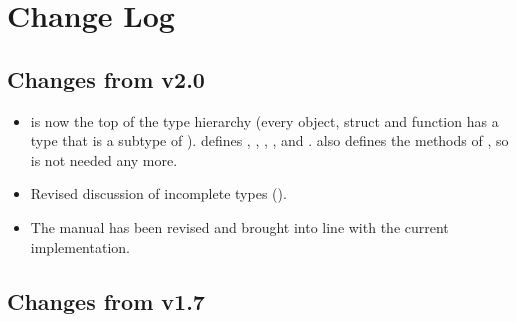 \documentclass[12pt,twoside,notitlepage]{report}
\begin{document}


 

\clearpage

{\parskip 0pt
\addtolength{\cftsecnumwidth}{0.5em}
\addtolength{\cftsubsecnumwidth}{0.5em}
\addtolength{\cftsubsecindent}{0.5em}
\tableofcontents
}




	







	
	
	
	
	
	



%
\renewcommand{\bibname}{References}



%	


\clearpage


\appendix

\chapter{Change Log}

\section{Changes from \Xten{} v2.0}

\begin{itemize}
\item {} is now the top of the type hierarchy (every object,
  struct and function has a type that is a subtype of
  ).  defines , , ,
  ,  and .  also defines the methods
  of , so  is not needed any more.
\item Revised discussion of incomplete types ().
\item The manual has been revised and brought into line with the current implementation. 
\end{itemize}
\section{Changes from \Xten{} v1.7}
\end{document}
